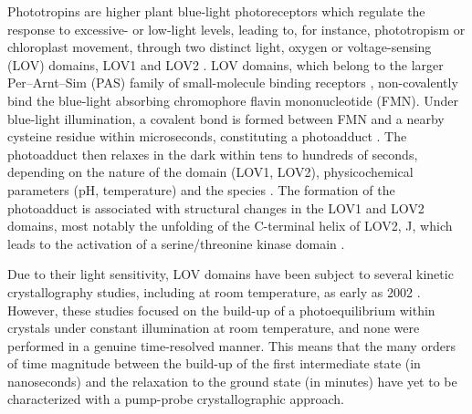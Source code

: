 Phototropins are higher plant blue-light photoreceptors which regulate the response to excessive- or low-light levels, leading to, for instance, phototropism or chloroplast movement, through two distinct light, oxygen or voltage-sensing (LOV) domains, LOV1 and LOV2 \parencite{christieStericInteractionsStabilize2007}. LOV domains, which belong to the larger Per–Arnt–Sim (PAS) family of small-molecule binding receptors \parencite{taylorPASDomainsInternal1999}, non-covalently bind the blue-light absorbing chromophore flavin mononucleotide (FMN). Under blue-light illumination, a covalent bond is formed between FMN and a nearby cysteine residue within microseconds, constituting a photoadduct \parencite{salomonPhotochemicalMutationalAnalysis2000, swartzPhotocycleFlavinbindingDomain2001,kasaharaPhotochemicalPropertiesFlavin2002}. The photoadduct then relaxes in the dark within tens to hundreds of seconds, depending on the nature of the domain (LOV1, LOV2), physicochemical parameters (pH, temperature) and the species \parencite{kasaharaPhotochemicalPropertiesFlavin2002}. The formation of the photoadduct is associated with structural changes in the LOV1 and LOV2 domains, most notably the unfolding of the C-terminal helix of LOV2, J\textalpha, which leads to the activation of a serine/threonine kinase domain \parencite{harperStructuralBasisPhototropin2003,harperDisruptionLOVJa2004}. 

Due to their light sensitivity, LOV domains have been subject to several kinetic crystallography studies, including at room temperature, as early as 2002 \parencite{crossonPhotoexcitedStructurePlant2002, fedorovCrystalStructuresMolecular2003, halavatyCTerminalFlankingRegions2007}. However, these studies focused on the build-up of a photoequilibrium within crystals under constant illumination at room temperature, and none were performed in a genuine time-resolved manner. This means that the many orders of time magnitude between the build-up of the first intermediate state (in nanoseconds) and the relaxation to the ground state (in minutes) have yet to be characterized with a pump-probe crystallographic approach. 



